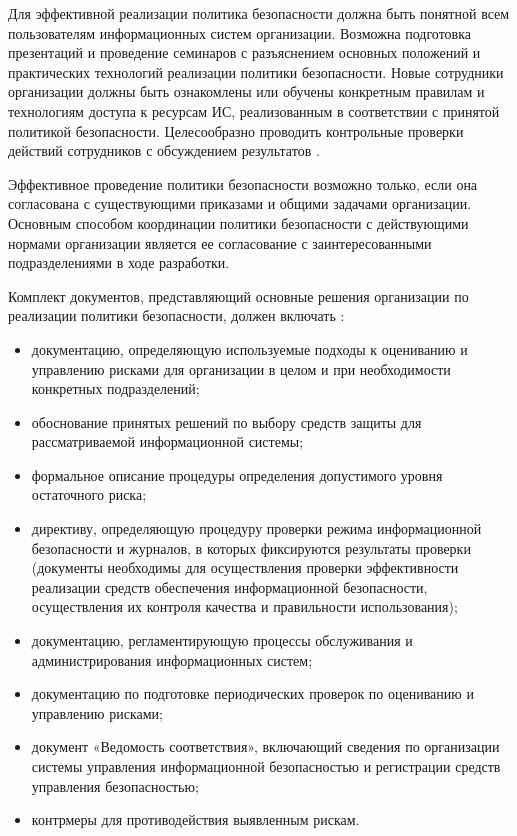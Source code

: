 Для эффективной реализации политика безопасности должна быть понятной всем пользователям информационных
систем организации. Возможна подготовка презентаций и проведение семинаров с разъяснением основных положений
и практических технологий реализации политики безопасности. Новые сотрудники организации должны быть ознакомлены
или обучены конкретным правилам и технологиям доступа к ресурсам ИС, реализованным в соответствии с принятой
политикой безопасности. Целесообразно проводить контрольные проверки действий сотрудников с обсуждением результатов \autocite{shveikin}.

Эффективное проведение политики безопасности возможно только, если она согласована с существующими приказами
и общими задачами организации. Основным способом координации политики безопасности с действующими нормами
организации является ее согласование с заинтересованными подразделениями в ходе разработки.

Комплект документов, представляющий основные решения организации по реализации политики безопасности,
должен включать \autocite{nurzhanov}:
\begin{itemize}
    \item
        документацию, определяющую используемые подходы к оцениванию и управлению рисками для
        организации в целом и при необходимости конкретных подразделений;

    \item
        обоснование принятых решений по выбору средств защиты для рассматриваемой информационной системы;

    \item
        формальное описание процедуры определения допустимого уровня остаточного риска;

    \item
        директиву, определяющую процедуру проверки режима информационной безопасности и журналов,
        в которых фиксируются результаты проверки (документы необходимы для осуществления проверки
        эффективности реализации средств обеспечения информационной безопасности, осуществления
        их контроля качества и правильности использования);

    \item
        документацию, регламентирующую процессы обслуживания и администрирования информационных систем;

    \item
        документацию по подготовке периодических проверок по оцениванию и управлению рисками;

    \item
        документ «Ведомость соответствия», включающий сведения по организации системы управления
        информационной безопасностью и регистрации средств управления безопасностью;

    \item
        контрмеры для противодействия выявленным рискам.
\end{itemize}

